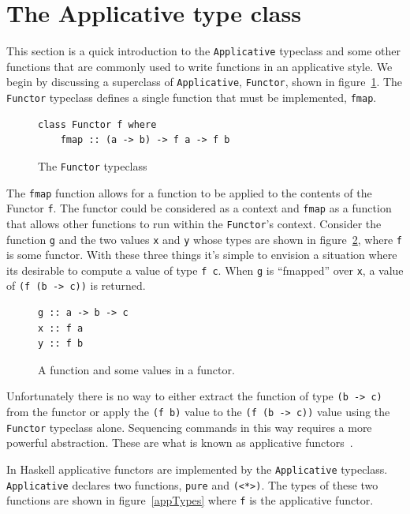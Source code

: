 \section{The Applicative type class}
\label{sec:appOverview}
This section is a quick introduction to the \texttt{Applicative} typeclass and some other functions that are commonly used to write functions in an applicative style. 
We begin by discussing a superclass of \texttt{Applicative}, \texttt{Functor}, shown in figure~\ref{functor}. The \texttt{Functor} typeclass defines a single function that must be implemented, \texttt{fmap}.

\begin{figure}
\begin{lstlisting}
class Functor f where
	fmap :: (a -> b) -> f a -> f b
\end{lstlisting}
\caption{The \texttt{Functor} typeclass}
\label{functor}
\end{figure}

The \texttt{fmap} function allows for a function to be applied to the contents of the Functor \texttt{f}. The functor could be considered as a context and \texttt{fmap} as a function that allows other functions to run within the \texttt{Functor}'s context. Consider the function \texttt{g}
and the two values \texttt{x} and \texttt{y} whose types are shown in figure~\ref{gxy}, where \texttt{f} is some functor. With these three things it's simple to envision a situation where its desirable to compute a value of type \texttt{f c}. When \texttt{g} is ``fmapped'' over   \texttt{x}, a value of \texttt{(f (b -> c))} is returned.

\begin{figure}[t]
\begin{lstlisting}
g :: a -> b -> c
x :: f a
y :: f b
\end{lstlisting}
\caption{A function and some values in a functor.}
\label{gxy}
\end{figure}

Unfortunately there is no way to either extract the function of type \texttt{(b -> c)} from the functor or apply the \texttt{(f b)} value to the \texttt{(f (b -> c))} value using the \texttt{Functor} typeclass alone. Sequencing commands in this way requires a more powerful abstraction. These are what is known as applicative functors~\citep{realWorldHaskell}. 

In Haskell applicative functors are implemented by the \texttt{Applicative} typeclass. \texttt{Applicative} declares two functions, \texttt{pure} and \texttt{(<*>)}. The types of these two functions are shown in figure~\ref{appTypes} where \texttt{f} is the applicative functor. 

